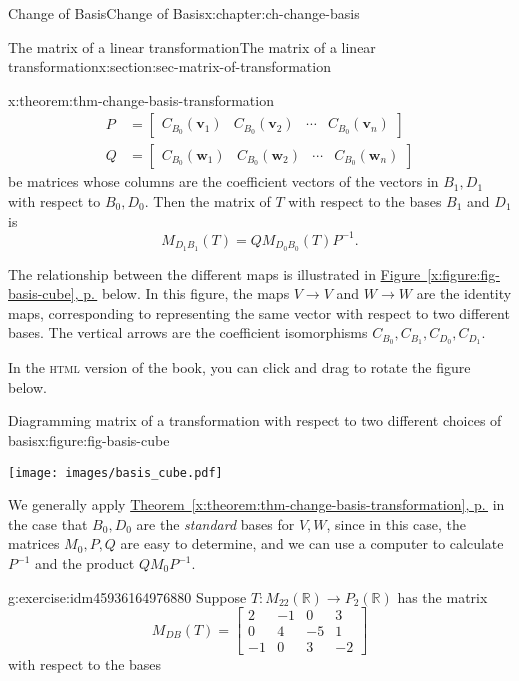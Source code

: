 \documentclass[oneside,10pt,]{book}
\newcommand{\xreffont}{\relax}
\newcommand{\initialism}[1]{\textsc{\MakeLowercase{#1}}}
\numberwithin{equation}{section}
\newcommand{\bbm}{\begin{bmatrix}}
\newcommand{\ebm}{\end{bmatrix}}
\newcommand{\R}{\mathbb{R}}
\newcommand{\vv}{\mathbf{v}}
\newcommand{\ww}{\mathbf{w}}
\newcommand{\amp}{&}
\begin{document}
\begin{chapterptx}{Change of Basis}{}{Change of Basis}{}{}{x:chapter:ch-change-basis}
\begin{sectionptx}{The matrix of a linear transformation}{}{The matrix of a linear transformation}{}{}{x:section:sec-matrix-of-transformation}
\begin{theorem}{}{}{x:theorem:thm-change-basis-transformation}
\begin{align*}
P \amp =\bbm C_{B_0}(\vv_1) \amp C_{B_0}(\vv_2) \amp \cdots \amp C_{B_0}(\vv_n)\ebm\\
Q \amp =\bbm C_{B_0}(\ww_1) \amp C_{B_0}(\ww_2) \amp \cdots \amp C_{B_0}(\ww_n)\ebm
\end{align*}
be matrices whose columns are the coefficient vectors of the vectors in \(B_1,D_1\) with respect to \(B_0,D_0\). Then the matrix of \(T\) with respect to the bases \(B_1\) and \(D_1\) is%
\begin{equation*}
M_{D_1B_1}(T) = QM_{D_0B_0}(T)P^{-1}\text{.}
\end{equation*}
%
\end{theorem}
The relationship between the different maps is illustrated in \hyperref[x:figure:fig-basis-cube]{Figure~{\xreffont\ref{x:figure:fig-basis-cube}}, p.\,\pageref{x:figure:fig-basis-cube}} below. In this figure, the maps \(V\to V\) and \(W\to W\) are the identity maps, corresponding to representing the same vector with respect to two different bases. The vertical arrows are the coefficient isomorphisms \(C_{B_0},C_{B_1},C_{D_0},C_{D_1}\).%
\par
In the \initialism{HTML} version of the book, you can click and drag to rotate the figure below.%
\begin{figureptx}{Diagramming matrix of a transformation with respect to two different choices of basis}{x:figure:fig-basis-cube}{}%
\centering
\begin{image}{0.165}{0.67}{0.165}%
\texttt{[image: images/basis\_cube.pdf]}
\end{image}%
\tcblower
\end{figureptx}%
We generally apply \hyperref[x:theorem:thm-change-basis-transformation]{Theorem~{\xreffont\ref{x:theorem:thm-change-basis-transformation}}, p.\,\pageref{x:theorem:thm-change-basis-transformation}} in the case that \(B_0,D_0\) are the \emph{standard} bases for \(V,W\), since in this case, the matrices \(M_0, P, Q\) are easy to determine, and we can use a computer to calculate \(P^{-1}\) and the product \(QM_0P^{-1}\).%
\begin{inlineexercise}{}{g:exercise:idm45936164976880}%
Suppose \(T:M_{22}(\R)\to P_2(\R)\) has the matrix%
\begin{equation*}
M_{DB}(T) = \bbm 2\amp -1\amp 0\amp 3\\0\amp 4\amp -5\amp 1\\-1\amp 0\amp 3\amp -2\ebm
\end{equation*}
with respect to the bases%

\end{inlineexercise}
\end{sectionptx}
\end{chapterptx}
\end{document}
